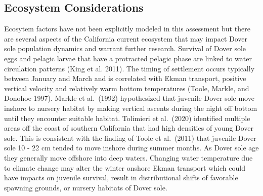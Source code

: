 \documentclass[11pt,
  english,
  a4paper,
]{article}
\begin{document}

\hypertarget{ecosystem-considerations}{%
\subsection*{Ecosystem Considerations}\label{ecosystem-considerations}}

\leavevmode\tagmcend\tagstructend


Ecosytem factors have not been explicitly modeled in this assessment but there are several aspects of the California current ecosystem that may impact Dover sole population dynamics and warrant further research. Survival of Dover sole eggs and pelagic larvae that have a protracted pelagic phase are linked to water circulation patterns {(King et al. 2011)\leavevmode\tagmcend\tagstructend}. The timing of settlement occurs typically between January and March and is correlated with Ekman transport, positive vertical velocity and relatively warm bottom temperatures {(Toole, Markle, and Donohoe 1997)\leavevmode\tagmcend\tagstructend}. Markle et al.~{(1992)\leavevmode\tagmcend\tagstructend} hypothesized that juvenile Dover sole move inshore to nursery habitat by making vertical ascents during the night off bottom until they encounter suitable habitat. Tolimieri et al.~{(2020)\leavevmode\tagmcend\tagstructend} identified multiple areas off the coast of southern California that had high densities of young Dover sole. This is consistent with the finding of Toole et al.~{(2011)\leavevmode\tagmcend\tagstructend} that juvenile Dover sole 10 - 22 cm tended to move inshore during summer months. As Dover sole age they generally move offshore into deep waters. Changing water temperature due to climate change may alter the winter onshore Ekman transport which could have impacts on juvenile survival, result in distributional shifts of favorable spawning grounds, or nursery habitats of Dover sole.

\leavevmode\tagmcend\tagstructend\par

\end{document}
